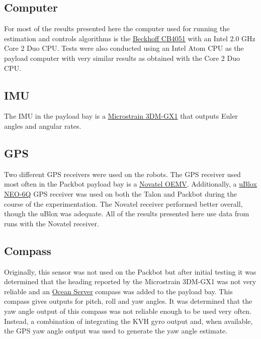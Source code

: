 \subsection{Computer}
\label{sec:bgComputer}
For most of the results presented here the computer used for running the estimation and controls algorithms is the \href{http://www.beckhoff.com/english.asp?motherboards/cb4051.htm}{Beckhoff CB4051} with an Intel 2.0 GHz Core 2 Duo CPU. Tests were also conducted using an Intel Atom CPU as the payload computer with very similar results as obtained with the Core 2 Duo CPU.

\subsection{IMU}
\label{sec:bgIMU}
The IMU in the payload bay is a \href{http://www.microstrain.com/3dm-gx1.aspx}{Microstrain 3DM-GX1} that outputs Euler angles and angular rates.

\subsection{GPS}
\label{sec:bgGPS}
Two different GPS receivers were used on the robots. The GPS receiver used most often in the Packbot payload bay is a \href{http://www.novatel.com/products/gnss-receivers/oem-receiver-boards/oemv-receivers/}{Novatel OEMV}. Additionally, a \href{http://www.u-blox.com/gps-modules.html}{uBlox NEO-6Q} GPS receiver was used on both the Talon and Packbot during the course of the experimentation. The Novatel receiver performed better overall, though the uBlox  was adequate. All of the results presented here use data from runs with the Novatel receiver.

\subsection{Compass}
\label{sec:bgCompass}
Originally, this sensor was not used on the Packbot but after initial testing it was determined that the heading reported by the Microstrain 3DM-GX1 was not very reliable and an \href{http://www.oceanserver-store.com/os3axdico3.html}{Ocean Server} compass was added to the payload bay. This compass gives outputs for pitch, roll and yaw angles. It was determined that the yaw angle output of this compass was not reliable enough to be used very often. Instead, a combination of integrating the KVH gyro output and, when available, the GPS yaw angle output was used to generate the yaw angle estimate.

